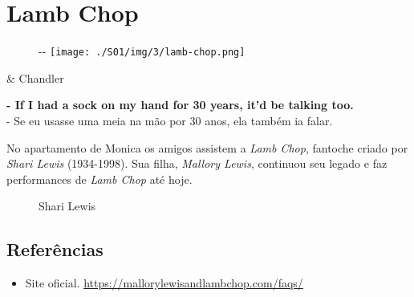 \hypertarget{lamb-chop}{%
\section{Lamb Chop}\label{lamb-chop}}

\begin{figure}[!ht]
  \begin{adjustwidth}{-\oddsidemargin-1in}{-\rightmargin}
    \centering
    \texttt{[image: ./S01/img/3/lamb-chop.png]}
  \end{adjustwidth}
\end{figure}

\begin{tcolorbox}[enhanced,center upper,
    drop fuzzy shadow southeast, boxrule=0.3pt,
    lower separated=false, breakable,
    colframe=black!30!dialogoBorder,colback=white]
\begin{minipage}[c]{0.16\linewidth}
   & \centering \scriptsize{Chandler}
\end{minipage}
\hfill
\begin{minipage}[c]{0.8\linewidth}
  \textbf{- If I had a sock on my hand for 30 years, it'd be talking too.}\\
  - Se eu usasse uma meia na mão por 30 anos, ela também ia falar.
\end{minipage}
\end{tcolorbox}

No apartamento de Monica os amigos assistem a \emph{Lamb Chop}, fantoche
criado por \emph{Shari Lewis} (1934-1998). Sua filha, \emph{Mallory
Lewis}, continuou seu legado e faz performances de \emph{Lamb Chop} até
hoje.

\begin{figure}
  \centering
    \caption{Shari Lewis\label{fig:shari-lewis}}
\end{figure}

\hypertarget{referuxeancias-5}{%
\subsection{Referências}\label{referuxeancias-5}}

\begin{itemize}
\tightlist
\item
  \sloppy Site oficial. \url{https://mallorylewisandlambchop.com/faqs/}
\end{itemize}
